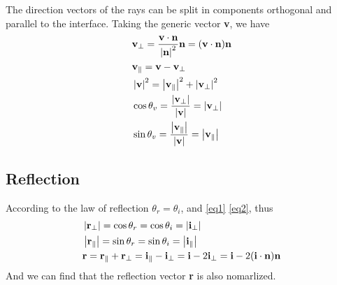 \documentclass[../main.tex]{subfiles}
\begin{document}
	The direction vectors of the rays can be split in components orthogonal and parallel to the interface. Taking the generic vector \textbf{v}, we have
	\begin{align}
	&\textbf{v}_{\perp}=\frac{\textbf{v}\cdot\textbf{n}}{\left\lvert\textbf{n}\right\rvert^2}\textbf{n}=(\textbf{v}\cdot\textbf{n})\textbf{n}\\
	&\textbf{v}_{\parallel}=\textbf{v}-\textbf{v}_{\perp}\\
	&\left\lvert\textbf{v}\right\rvert^2=\left\lvert\textbf{v}_{\parallel}\right\rvert^2+\left\lvert\textbf{v}_{\perp}\right\rvert^2\\
	&\cos\theta_v=\frac{\left\lvert\textbf{v}_{\perp}\right\rvert}{\left\lvert\textbf{v}\right\rvert}=\left\lvert\textbf{v}_{\perp}\right\rvert\label{eq1}\\
	&\sin\theta_v=\frac{\left\lvert\textbf{v}_{\parallel}\right\rvert}{\left\lvert\textbf{v}\right\rvert}=\left\lvert\textbf{v}_{\parallel}\right\rvert\label{eq2}
	\end{align}
	\subsection{Reflection}
	According to the law of reflection $\theta_r=\theta_i$, and \ref{eq1} \ref{eq2}, thus
	\begin{align}
	&\left\lvert\textbf{r}_{\perp}\right\rvert=\cos\theta_r=\cos\theta_i=\left\lvert\textbf{i}_{\perp}\right\rvert\\
	&\left\lvert\textbf{r}_{\parallel}\right\rvert=\sin\theta_r=\sin\theta_i=\left\lvert\textbf{i}_{\parallel}\right\rvert\\
	&\textbf{r}=\textbf{r}_{\parallel}+\textbf{r}_{\perp}=\textbf{i}_{\parallel}-\textbf{i}_{\perp}=\textbf{i}-2\textbf{i}_{\perp}=\textbf{i}-2(\textbf{i}\cdot\textbf{n})\textbf{n}
	\end{align}
	And we can find that the reflection vector \textbf{r} is also nomarlized.
\end{document}
